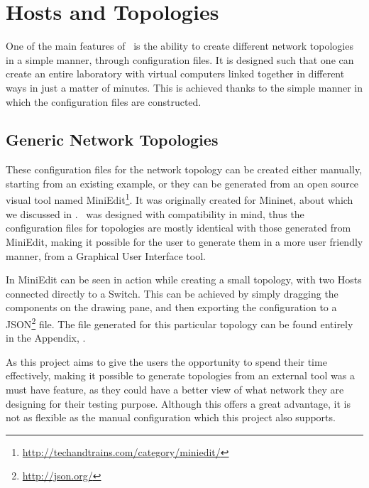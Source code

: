 \section{Hosts and Topologies}
\label{sec:hosts-and-topologies}

One of the main features of \project\ is the ability to create different network topologies in a simple manner, through configuration files.
It is designed such that one can create an entire laboratory with virtual computers linked together in different ways in just a matter of minutes.
This is achieved thanks to the simple manner in which the configuration files are constructed.

\subsection{Generic Network Topologies}
\label{sub-sec:generic-network-topologies}

These configuration files for the network topology can be created either manually, starting from an existing example, or they can be generated from an open source visual tool named MiniEdit\footnote{\url{http://techandtrains.com/category/miniedit/}}.
It was originally created for Mininet, about which we discussed in .
\project\ was designed with compatibility in mind, thus the configuration files for topologies are mostly identical with those generated from MiniEdit, making it possible for the user to generate them in a more user friendly manner, from a Graphical User Interface tool.


In  MiniEdit can be seen in action while creating a small topology, with two Hosts connected directly to a Switch.
This can be achieved by simply dragging the components on the drawing pane, and then exporting the configuration to a JSON\footnote{\url{http://json.org/}} file.
The file generated for this particular topology can be found entirely in the Appendix, .

As this project aims to give the users the opportunity to spend their time effectively, making it possible to generate topologies from an external tool was a must have feature, as they could have a better view of what network they are designing for their testing purpose.
Although this offers a great advantage, it is not as flexible as the manual configuration which this project also supports.

